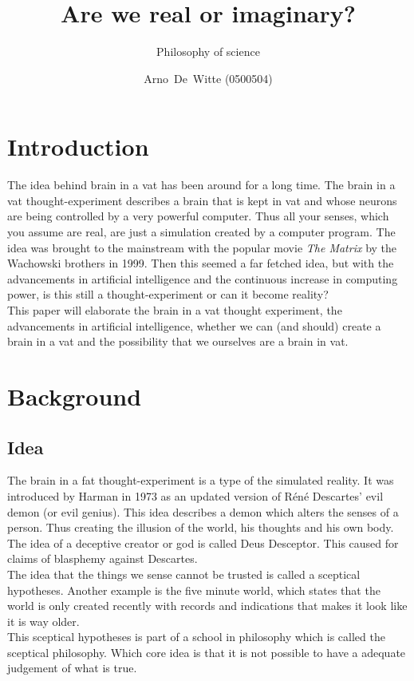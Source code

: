 \documentclass[a4paper]{article}
\author{Arno~De~Witte (0500504)}
\title{Are we real or imaginary?}
\subtitle{Philosophy of science}
\begin{document}
\makeassignment
\section{Introduction}
The idea behind brain in a vat has been around for a long time. The brain in a vat thought-experiment describes a brain that is kept in vat and whose neurons are being controlled by a very powerful computer. Thus all your senses, which you assume are real, are just a simulation created by a computer program. The idea was brought to the mainstream with the popular movie \emph{The Matrix} by the Wachowski brothers in 1999. Then this seemed a far fetched idea, but with the advancements in artificial intelligence and the continuous increase in computing power, is this still a thought-experiment or can it become reality?\\

This paper will elaborate the brain in a vat thought experiment, the advancements in artificial intelligence, whether we can (and should) create a brain in a vat and the possibility that we ourselves are a brain in vat.

\section{Background}
\subsection{Idea}
The brain in a fat thought-experiment is a type of the simulated reality. It was introduced by Harman \cite{Harman15} in 1973 as an updated version of Réné Descartes' evil demon (or evil genius). This idea describes a demon which alters the senses of a person. Thus creating the illusion of the world, his thoughts and his own body. The idea of a deceptive creator or god is called Deus Desceptor. This caused for claims of blasphemy against Descartes.\\

The idea that the things we sense cannot be trusted is called a sceptical hypotheses. Another example is the five minute world, which states that the world is only created recently with records and indications that makes it look like it is way older.\\
This sceptical hypotheses is part of a school in philosophy which is called the sceptical philosophy. Which core idea is that it is not possible to have a adequate judgement of what is true.
\end{document}
